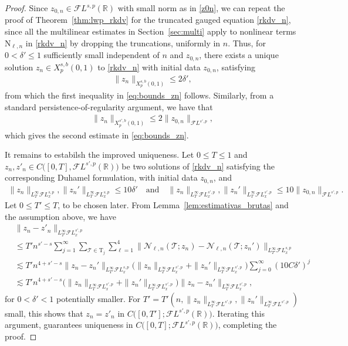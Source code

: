 \documentclass[a4paper,
11pt,  reqno]{amsart}
\newcommand{\5}{\textup{V}}
\newcommand{\FL}{\mathcal{F} L}
\newcommand{\les}{\lesssim}
\newcommand{\dl}{\delta}
\theoremstyle{remark}
\newcommand{\R}{\mathbb{R}}
\newcommand{\TT}{\mathcal{T}}
\newcommand{\Tr}{\mathrm{T}}
\renewcommand{\l}{\ell}
\numberwithin{equation}{section}
\numberwithin{theorem}{section}
\newcommand{\NN}{\mathrm{N}}
\newcommand{\Ncal}{\mathcal{N}}
\begin{document}
\begin{proof}

Since $z_{0,n} \in \FL^{s,p}(\R)$ with small norm as in \eqref{z0n}, we can repeat the proof of Theorem~\ref{thm:lwp_rkdv} for the truncated gauged equation \eqref{rkdv_n}, since all the multilinear estimates in Section~\ref{sec:multi} apply to nonlinear terms $\NN_{\l, n}$ in \eqref{rkdv_n} by dropping the truncations, uniformly in $n$. Thus, for $0 < \dl' \le 1$ sufficiently small independent of $n$ and $z_{0,n}$, there exists a unique solution $z_n \in X^{s, b}_p(0,1)$ to \eqref{rkdv_n} with initial data $z_{0,n}$, satisfying
\begin{align}
\| z_n \|_{X^{s,b}_p(0,1)} \le 2 \dl ',
\end{align}
from which the first inequality in \eqref{eq:bounds_zn} follows. Similarly, from a standard persistence-of-regularity argument, we have that
\begin{align*}
\| z_n \|_{X^{s',b}_p (0,1)} \le 2 \| z_{0,n} \|_{\FL^{s',p}},
\end{align*}
which gives the second estimate in  \eqref{eq:bounds_zn}.

\smallskip

It remains to estabilsh the improved uniqueness. Let $0\le T\le 1$ and $z_n,z'_n\in C\big([0,T], \FL^{s',p}(\R)\big)$ be two solutions of \eqref{rkdv_n} satisfying the corresponding Duhamel formulation, with initial data $z_{0,n}$, and
\begin{align*}
\| z_n \|_{L^\infty_T \FL^{s,p}_x} , \| z_n' \|_{L^\infty_T  \FL^{s,p}_x} \le 10 \dl'
\quad
\text{and}
\quad
\| z_n \|_{L^\infty_T \FL^{s',p}_x} , \| z_n' \|_{L^\infty_T  \FL^{s',p}_x} \le 10 \| z_{0,n} \|_{\FL^{s',p}}.
\end{align*}
Let $0\le T'\le T $, to be chosen later. From Lemma~\ref{lem:estimativas_brutas} and the assumption above, we have
	\begin{align*}
&
\|z_n-z'_n\|_{L^\infty_{T'}\FL^{s',p}_x}
\\
&
\le
T' n^{s'-s} \sum_{j=1}^\infty \sum_{\TT \in \Tr_j} \sum_{\l=1}^4 \big\| \Ncal_{\l, n}(\TT; z_n) - \Ncal_{\l, n} (\TT; z_n') \big\|_{L^\infty_{T'} \FL^{s,p}_x}
\\
&
\les T' n^{4 + s'-s} \|z_n - z_n' \|_{L^\infty_{T'} \FL^{s,p}_x}
\big(
\| z_n \|_{L^\infty_T  \FL^{s',p}_x}
+
\| z_n' \|_{L^\infty_T  \FL^{s',p}_x}
\big)
\sum_{j=0}^\infty (10 C \dl')^j
\\&\les T' n^{4+s'-s}\big(
\| z_n \|_{L^\infty_T  \FL^{s',p}_x}
+
\| z_n' \|_{L^\infty_T  \FL^{s',p}_x}
\big)
 \|z_n - z_n' \|_{L^\infty_T \FL^{s',p}_x}
,
	\end{align*}
for $0<\dl'<1 $ potentially smaller.
For $T'  = T'(n, \|z_{n}\|_{L^\infty_T \FL^{s',p}}, \|z_{n}'\|_{L^\infty_T \FL^{s',p}}) $ small, this shows that $z_n=z'_n$ in $C\big([0,T']; \FL^{s',p}(\R) \big)$. Iterating this argument, guarantees uniqueness in $C\big([0,T] ; \FL^{s',p}(\R)\big)$, completing the proof. \qedhere

\end{proof}
\end{document}
